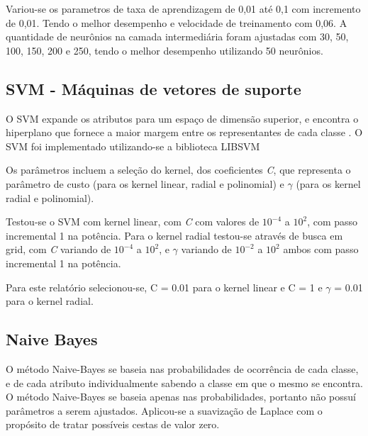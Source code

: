 Variou-se os parametros de taxa de aprendizagem de 0,01 até 0,1 com incremento de 0,01. Tendo o melhor desempenho e velocidade de treinamento com 0,06. A quantidade de neurônios na camada intermediária foram ajustadas com 30, 50, 100, 150, 200 e 250, tendo o melhor desempenho utilizando 50 neurônios.

\subsection{SVM - Máquinas de vetores de suporte}

O SVM expande os atributos para um espaço de dimensão superior, e encontra o hiperplano que fornece a maior margem entre os representantes de cada classe \cite{praticalSVM}. O SVM foi implementado utilizando-se a biblioteca LIBSVM \cite{libsvm}

Os parâmetros incluem a seleção do kernel, dos coeficientes \emph{C}, que representa o parâmetro de custo (para os kernel linear, radial e polinomial) e \(\gamma\) (para os kernel radial e polinomial).

Testou-se o SVM com kernel linear, com \emph{C} com valores de \(10^{-4}\) a \(10^2\), com passo incremental 1 na potência. Para o kernel radial testou-se através de busca em grid, com \emph{C} variando de \(10^{-4}\) a \(10^2\), e \(\gamma\) variando de \(10^{-2}\) a \(10^2\) ambos com passo incremental 1 na potência.

Para este relatório selecionou-se, C = 0.01 para o kernel linear e C = 1 e \(\gamma\) = 0.01 para o kernel radial.

\subsection{Naive Bayes}

O método Naive-Bayes se baseia nas probabilidades de ocorrência de cada classe, e de cada atributo individualmente sabendo a classe em que o mesmo se encontra. O método Naive-Bayes se baseia apenas nas probabilidades, portanto não possuí parâmetros a serem ajustados. Aplicou-se a suavização de Laplace com o propósito de tratar possíveis cestas de valor zero.

